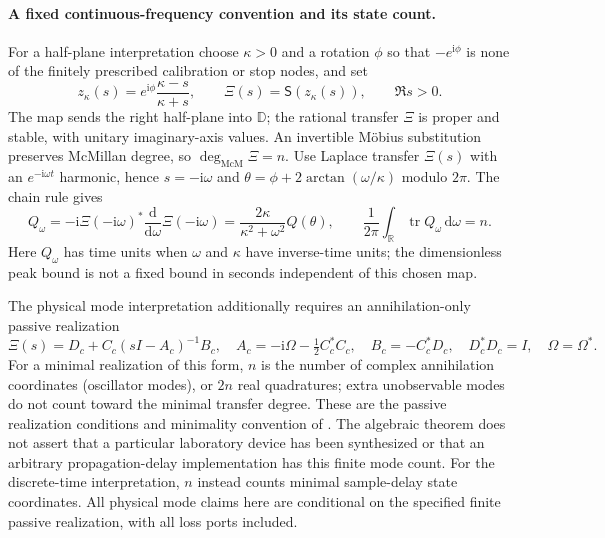 \documentclass[11pt]{article}
\theoremstyle{definition}
\theoremstyle{remark}
\newcommand{\D}{\mathbb{D}}
\newcommand{\tr}{\operatorname{tr}}
\newcommand{\dd}{\mathrm{d}}
\newcommand{\mcdeg}{\deg_{\mathrm{McM}}}
\begin{document}
\paragraph{A fixed continuous-frequency convention and its state count.}
For a half-plane interpretation choose $\kappa>0$ and a rotation $\phi$
so that $-e^{\mathrm{i}\phi}$ is none of the finitely prescribed calibration
or stop nodes, and set
\begin{equation}\label{eq:cayleymap}
 z_\kappa(s)=e^{\mathrm{i}\phi}\frac{\kappa-s}{\kappa+s},
 \qquad \Xi(s)=\mathsf S(z_\kappa(s)),\qquad \Re s>0.
\end{equation}
The map sends the right half-plane into $\D$; the rational transfer $\Xi$
is proper and stable, with unitary imaginary-axis values. An invertible
M\"obius substitution preserves McMillan degree, so $\mcdeg\Xi=n$.
Use Laplace transfer $\Xi(s)$ with an $e^{-\mathrm{i}\omega t}$ harmonic,
hence $s=-\mathrm{i}\omega$ and
$\theta=\phi+2\arctan(\omega/\kappa)$ modulo $2\pi$. The chain rule gives
\begin{equation}\label{eq:physicaldelay}
 Q_\omega=-\mathrm{i}\Xi(-\mathrm{i}\omega)^*
       \frac{\dd}{\dd\omega}\Xi(-\mathrm{i}\omega)
 =\frac{2\kappa}{\kappa^2+\omega^2}Q(\theta),\qquad
 \frac1{2\pi}\int_{\mathbb R}\tr Q_\omega\,\dd\omega=n.
\end{equation}
Here $Q_\omega$ has time units when $\omega$ and $\kappa$ have inverse-time
units; the dimensionless peak bound is not a fixed bound in seconds
independent of this chosen map.

The physical mode interpretation additionally requires an annihilation-only
passive realization
\[
 \Xi(s)=D_c+C_c(sI-A_c)^{-1}B_c,\quad
 A_c=-\mathrm{i}\Omega-\tfrac12C_c^*C_c,\quad
 B_c=-C_c^*D_c,\quad D_c^*D_c=I,\quad \Omega=\Omega^*.
\]
For a minimal realization of this form, $n$ is the number of complex
annihilation coordinates (oscillator modes), or $2n$ real quadratures;
extra unobservable modes do not count toward the minimal transfer degree.
These are the passive realization conditions and minimality convention of
\cite[\S\S3.1--3.3, Theorem~3.5]{GoughZhang2015}. The algebraic theorem does
not assert that a particular laboratory device has been synthesized or
that an arbitrary propagation-delay implementation has this finite mode
count. For the discrete-time interpretation, $n$ instead counts minimal
sample-delay state coordinates. All physical mode claims here are conditional
on the specified finite passive realization, with all loss ports included.
\end{document}

